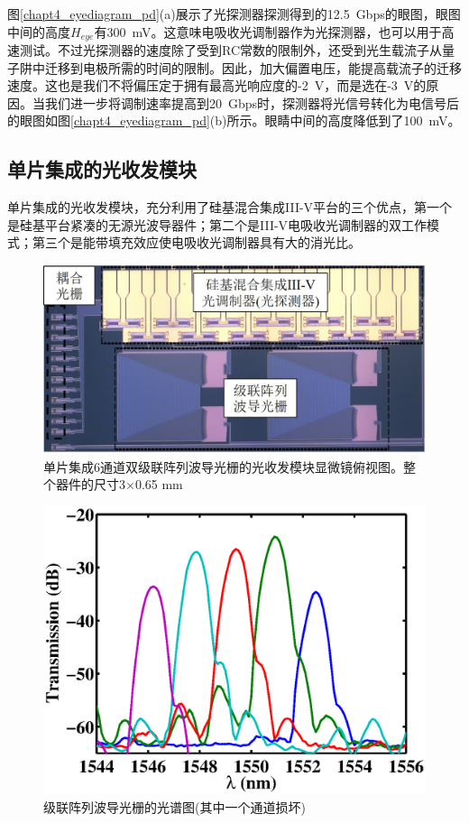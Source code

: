 图\ref{chapt4_eyediagram_pd}(a)展示了光探测器探测得到的12.5~Gbps的眼图，眼图中间的高度$H_{eye}$有300~mV。这意味电吸收光调制器作为光探测器，也可以用于高速测试。不过光探测器的速度除了受到RC常数的限制外，还受到光生载流子从量子阱中迁移到电极所需的时间的限制。因此，加大偏置电压，能提高载流子的迁移速度。这也是我们不将偏压定于拥有最高光响应度的-2~V，而是选在-3~V的原因。当我们进一步将调制速率提高到20~Gbps时，探测器将光信号转化为电信号后的眼图如图\ref{chapt4_eyediagram_pd}(b)所示。眼睛中间的高度降低到了100~mV。

\subsection{单片集成的光收发模块}
单片集成的光收发模块，充分利用了硅基混合集成III-V平台的三个优点，第一个是硅基平台紧凑的无源光波导器件；第二个是III-V电吸收光调制器的双工作模式；第三个是能带填充效应使电吸收光调制器具有大的消光比。
\begin{figure}[htb]
	\centering
	\includegraphics[width=12cm]{./Pictures/chapt4_casacade_awg_structure.jpg}
	\caption{单片集成6通道双级联阵列波导光栅的光收发模块显微镜俯视图。整个器件的尺寸3$\times$0.65 mm}
	\label{chapt4_casacade_awg_structure}
\end{figure}
\begin{figure}[htb]
	\centering
	\includegraphics[width=12cm]{./Pictures/chapt4_cascade_awg_spectra.eps}
	\caption{级联阵列波导光栅的光谱图(其中一个通道损坏)}
	\label{chapt4_cascade_awg_spectra}
\end{figure}

